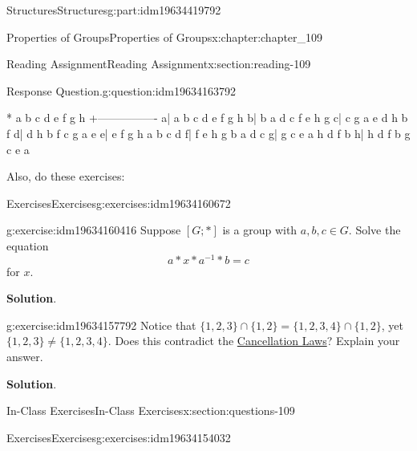\documentclass[oneside,10pt,]{book}
\newcommand{\blocktitlefont}{\relax}
\numberwithin{equation}{section}
\begin{document}
\begin{partptx}{Structures}{}{Structures}{}{}{g:part:idm19634419792}
\begin{chapterptx}{Properties of Groups}{}{Properties of Groups}{}{}{x:chapter:chapter_109}
\begin{sectionptx}{Reading Assignment}{}{Reading Assignment}{}{}{x:section:reading-109}
\begin{question}{Response Question.}{g:question:idm19634163792}
\begin{sageoutput}
*  a b c d e f g h
 +----------------
a| a b c d e f g h
b| b a d c f e h g
c| c g a e d h b f
d| d h b f c g a e
e| e f g h a b c d
f| f e h g b a d c
g| g c e a h d f b
h| h d f b g c e a
\end{sageoutput}
\end{question}
Also, do these exercises:%
%
%
\typeout{************************************************}
\typeout{************************************************}
%
\begin{exercises-subsection-numberless}{Exercises}{}{Exercises}{}{}{g:exercises:idm19634160672}
\par\medskip\noindent%
%
\begin{exercisegroup}
\begin{divisionexerciseeg}{1}{}{}{g:exercise:idm19634160416}%
Suppose \([G;*]\) is a group with \(a,b,c \in G\).   Solve the equation%
\begin{equation*}
a*x*a^{-1}*b= c
\end{equation*}
for \(x\).%
\par\smallskip%
\noindent\textbf{\blocktitlefont Solution}.\hypertarget{g:solution:idm19634160288}{}\quad{}%
\end{divisionexerciseeg}%
\begin{divisionexerciseeg}{2}{}{}{g:exercise:idm19634157792}%
Notice that \(\{1,2,3\} \cap \{1,2\} = \{1,2,3,4\} \cap \{1,2\}\), yet \(\{1,2,3\}  \neq \{1,2,3,4\} \). Does this contradict the \hyperref[x:theorem:theorem-11-3-cancellation]{Cancellation Laws}? Explain your answer.%
\par\smallskip%
\noindent\textbf{\blocktitlefont Solution}.\hypertarget{g:solution:idm19634156064}{}\quad{}%
\end{divisionexerciseeg}%
\end{exercisegroup}
\par\medskip\noindent
\end{exercises-subsection-numberless}
\end{sectionptx}
%
%
\typeout{************************************************}
\typeout{************************************************}
%
\begin{sectionptx}{In-Class Exercises}{}{In-Class Exercises}{}{}{x:section:questions-109}
%
%
%
\typeout{************************************************}
\typeout{************************************************}
%
\begin{exercises-subsection-numberless}{Exercises}{}{Exercises}{}{}{g:exercises:idm19634154032}

\end{exercises-subsection-numberless}
\end{sectionptx}
\end{chapterptx}
\end{partptx}
\end{document}
